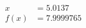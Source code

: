 \documentclass[preview]{standalone}
\begin{document}
\begin{align*}
x &= 5.0137\\f(x) &= 7.9999765
\end{align*}
\end{document}
